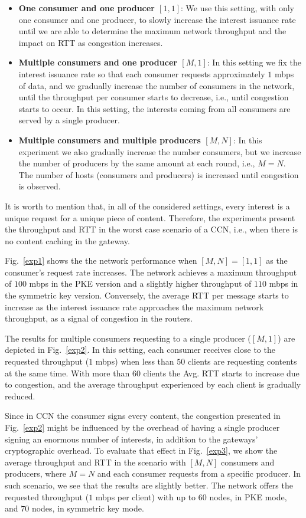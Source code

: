 \begin{itemize}
 \item \textbf{One consumer and one producer $[1,1]$}: We use this setting, with
 only one consumer and one producer, to slowly increase the interest issuance
 rate until we are able to determine the maximum network throughput and the
 impact on RTT as congestion increases.
 \item \textbf{Multiple consumers and one producer $[M,1]$}: In this setting we
 fix the interest issuance rate so that each consumer requests approximately $1$
 mbps of data, and we gradually increase the number of consumers in the network,
 until the throughput per consumer starts to decrease, i.e., until congestion
 starts to occur. In this setting, the interests coming from all consumers are
 served by a single producer.
 \item \textbf{Multiple consumers and multiple producers $[M,N]$}: In this experiment
 we also gradually increase the number consumers, but we increase the number of
 producers by the same amount at each round, i.e., $M=N$. The number of hosts
 (consumers and producers) is increased until congestion is observed.
\end{itemize}

It is worth to mention that, in all of the considered settings, every interest
is a unique request for a unique piece of content. Therefore, the experiments
present the throughput and RTT in the worst case scenario of a CCN, i.e., when
there is no content caching in the gateway.

Fig.~\ref{exp1} shows the the network performance when $[M,N]=[1,1]$ as the
consumer's request rate increases. The network achieves a maximum throughput of
$100$ mbps in the PKE version and a slightly higher throughput of $110$ mbps in
the symmetric key version. Conversely, the average RTT per message starts to
increase as the interest issuance rate approaches the maximum network throughput,
as a signal of congestion in the routers.

The results for multiple consumers requesting to a single producer ($[M,1]$) are
depicted in Fig.~\ref{exp2}. In this setting, each consumer receives close to the
requested throughput ($1$ mbps) when less than $50$ clients are requesting contents at
the same time. With more than $60$ clients the Avg. RTT starts to increase due to
congestion, and the average throughput experienced by each client is gradually reduced.

Since in CCN the consumer signs every content, the congestion presented in
Fig.~\ref{exp2} might be influenced by the overhead of having a single producer
signing an enormous number of interests, in addition to the gateways' cryptographic overhead.
To evaluate that effect in Fig.~\ref{exp3}, we show the average throughput and RTT
in the scenario with $[M,N]$ consumers and producers, where $M=N$ and each consumer
requests from a specific producer. In such scenario, we see that the results are
slightly better. The network offers the requested throughput ($1$ mbps per client)
with up to $60$ nodes, in PKE mode, and $70$ nodes, in symmetric key mode.



